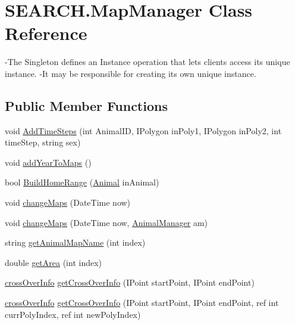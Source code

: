 \hypertarget{class_s_e_a_r_c_h_1_1_map_manager}{\section{S\-E\-A\-R\-C\-H.\-Map\-Manager Class Reference}
\label{class_s_e_a_r_c_h_1_1_map_manager}
}


-\/\-The Singleton defines an Instance operation that lets clients access its unique instance. -\/\-It may be responsible for creating its own unique instance.  


\subsection*{Public Member Functions}
\begin{DoxyCompactItemize}
\item 
void \hyperlink{class_s_e_a_r_c_h_1_1_map_manager_ac657954ead9f16fbbf97effdde051e77}{Add\-Time\-Steps} (int Animal\-I\-D, I\-Polygon in\-Poly1, I\-Polygon in\-Poly2, int time\-Step, string sex)
\item 
void \hyperlink{class_s_e_a_r_c_h_1_1_map_manager_a428d209dad0b5b7e6b8378130bd12766}{add\-Year\-To\-Maps} ()
\item 
bool \hyperlink{class_s_e_a_r_c_h_1_1_map_manager_acbeabd749787ebe68fb1d083ca73e34a}{Build\-Home\-Range} (\hyperlink{class_s_e_a_r_c_h_1_1_animal}{Animal} in\-Animal)
\item 
void \hyperlink{class_s_e_a_r_c_h_1_1_map_manager_a897d6735454da9ab7bcc2f2aaaeb994b}{change\-Maps} (Date\-Time now)
\item 
void \hyperlink{class_s_e_a_r_c_h_1_1_map_manager_a0d563bb25977ddb406a15ca264fc309d}{change\-Maps} (Date\-Time now, \hyperlink{class_s_e_a_r_c_h_1_1_animal_manager}{Animal\-Manager} am)
\item 
string \hyperlink{class_s_e_a_r_c_h_1_1_map_manager_a9d86cfdf5134baf7d61e964ff06cae49}{get\-Animal\-Map\-Name} (int index)
\item 
double \hyperlink{class_s_e_a_r_c_h_1_1_map_manager_a29a454c0d94a365187d4af92b5eae6e0}{get\-Area} (int index)
\item 
\hyperlink{class_s_e_a_r_c_h_1_1cross_over_info}{cross\-Over\-Info} \hyperlink{class_s_e_a_r_c_h_1_1_map_manager_a36bdc07ef76214e76fadc7353a9efa8d}{get\-Cross\-Over\-Info} (I\-Point start\-Point, I\-Point end\-Point)
\item 
\hyperlink{class_s_e_a_r_c_h_1_1cross_over_info}{cross\-Over\-Info} \hyperlink{class_s_e_a_r_c_h_1_1_map_manager_a49f6945596841632b839f353cd6c3a58}{get\-Cross\-Over\-Info} (I\-Point start\-Point, I\-Point end\-Point, ref int curr\-Poly\-Index, ref int new\-Poly\-Index)

\end{DoxyCompactItemize}
